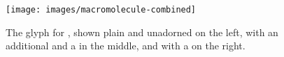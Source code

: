 \begin{figure}[H]
  \centering
  \texttt{[image: images/macromolecule-combined]}%
  \caption{The \PD glyph for , shown plain and unadorned on the left, with an additional  and a  in the middle, and with a  on the right.}
  \label{fig:macromolecule}
\end{figure}


